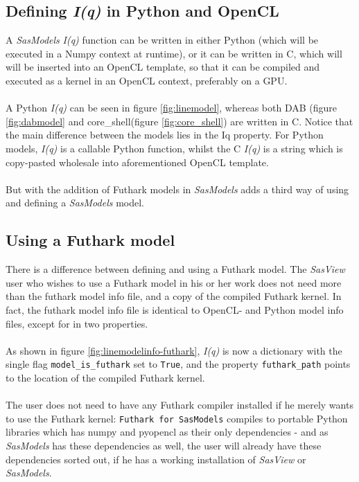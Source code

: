 \documentclass[11pt]{article}
\newcommand{\sasmodels}{\textit{SasModels}}
\newcommand{\sasview}{\textit{SasView}}
\newcommand{\iq}{\textit{I(q)}}
\newcommand{\futhark}{\texttt{Futhark for SasModels}}
\begin{document}
\subsection{Defining \iq{} in Python and OpenCL}
A \sasmodels{} \iq{} function can be written in either Python (which will be
executed in a Numpy context at runtime), or it can be written in C, which will
will be inserted into an OpenCL template, so that it can be compiled and 
executed as a kernel in an OpenCL context, preferably on a GPU.
\\\\
A Python \iq{} can be seen in figure \ref{fig:linemodel}, whereas both DAB 
(figure
\ref{fig:dabmodel} and core\_shell(figure \ref{fig:core_shell}) are written in C.
Notice that the main difference between the models lies in the Iq property.
For Python models, \iq{} is a callable Python function, whilst the C \iq{} is a
 string which is copy-pasted wholesale into aforementioned OpenCL template.
\\\\
But with the addition of Futhark models in \sasmodels{} adds a third way of
using and defining a \sasmodels{} model.

\subsection{Using a Futhark model}
\label{sec:using-futhark}
There is a difference between defining and using a Futhark model.
The \sasview{} user who wishes to use a Futhark model in his or her work does 
not need more than the futhark model info file, and a copy of the compiled
Futhark kernel. In fact, the futhark model info file is identical to OpenCL- 
and Python model info files, except for in two properties.
\\\\
As shown in figure \ref{fig:linemodelinfo-futhark}, \iq{} is now a dictionary
with the single flag \texttt{model\_is\_futhark} set to \texttt{True},
and the property \texttt{futhark\_path} points to the location of the compiled
Futhark kernel.
\\\\
The user does not need to have any Futhark compiler installed if he merely wants
to use the Futhark kernel: \futhark{} compiles to portable Python libraries which 
has numpy and pyopencl as their only dependencies - and as \sasmodels{} has these 
dependencies as well, the user will already have these dependencies sorted out, 
if he has a working installation of \sasview{} or \sasmodels{}.
\end{document}
